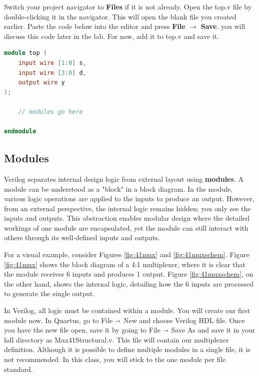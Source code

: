 \documentclass[12pt]{labmanual}
\begin{document}
Switch your project navigator to \textbf{Files} if it is not already. Open the top.v file by double-clicking it in the navigator. This will open the blank file you created earlier. Paste the code below into the editor and press \textbf{File} $\longrightarrow$ \textbf{Save}. you will discuss this code later in the lab. For now, add it to top.v and save it.

\begin{lstlisting}[language=verilog]
module top (
    input wire [1:0] s,
    input wire [3:0] d,
    output wire y
);

    // modules go here

endmodule
\end{lstlisting}

\subsection{Modules}
Verilog separates internal design logic from external layout using \textbf{modules}. A module can be understood as a "block" in a block diagram. In the module, various logic operations are applied to the inputs to produce an output. However, from an external perspective, the internal logic remains hidden; you only see the inputs and outputs. This abstraction enables modular design where the detailed workings of one module are encapsulated, yet the module can still interact with others through its well-defined inputs and outputs.

For a visual example, consider Figures \ref{fig:41mux} and \ref{fig:41muxschem}. Figure \ref{fig:41mux} shows the block diagram of a 4:1 multiplexer, where it is clear that the module receives 6 inputs and produces 1 output. Figure \ref{fig:41muxschem}, on the other hand, shows the internal logic, detailing how the 6 inputs are processed to generate the single output.

In Verilog, all logic must be contained within a module. You will create our first module now. In Quartus, go to File $\shortrightarrow$ New and choose Verilog HDL file. Once you have the new file open, save it by going to File $\shortrightarrow$ Save As and save it in your hdl directory as Mux41Structural.v. This file will contain our multiplexer definition. Although it is possible to define multiple modules in a single file, it is not recommended. In this class, you will stick to the one module per file standard.
\end{document}
